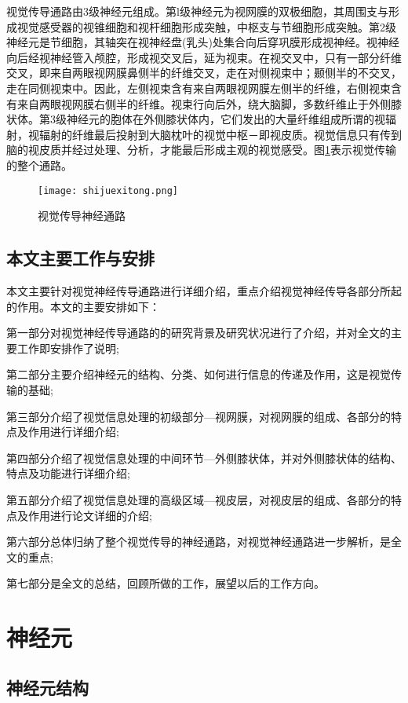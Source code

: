 \documentclass[a4paper,10pt]{article}\large
\begin{document}
视觉传导通路由3级神经元组成\cite{4:misc}。第l级神经元为视网膜的双极细胞，其周围支与形成视觉感受器的视锥细胞和视杆细胞形成突触，中枢支与节细胞形成突触。第2级神经元是节细胞，其轴突在视神经盘(乳头)处集合向后穿巩膜形成视神经。视神经向后经视神经管入颅腔，形成视交叉后，延为视束。在视交叉中，只有一部分纤维交叉，即来自两眼视网膜鼻侧半的纤维交叉，走在对侧视束中；颞侧半的不交叉，走在同侧视束中。因此，左侧视束含有来自两眼视网膜左侧半的纤维，右侧视束含有来自两眼视网膜右侧半的纤维。视束行向后外，绕大脑脚，多数纤维止于外侧膝状体。第3级神经元的胞体在外侧膝状体内，它们发出的大量纤维组成所谓的视辐射，视辐射的纤维最后投射到大脑枕叶的视觉中枢－即视皮质。视觉信息只有传到脑的视皮质并经过处理、分析，才能最后形成主观的视觉感受。图\ref{fig 1}表示视觉传输的整个通路。


\begin{figure}[!htb]
\centering
\texttt{[image: shijuexitong.png]}
\caption{视觉传导神经通路}\label{fig 1} 
\end{figure}


\subsection{本文主要工作与安排}

本文主要针对视觉神经传导通路进行详细介绍，重点介绍视觉神经传导各部分所起的作用。本文的主要安排如下：


第一部分对视觉神经传导通路的的研究背景及研究状况进行了介绍，并对全文的主要工作即安排作了说明;


第二部分主要介绍神经元的结构、分类、如何进行信息的传递及作用，这是视觉传输的基础;


第三部分介绍了视觉信息处理的初级部分---视网膜，对视网膜的组成、各部分的特点及作用进行详细介绍;


第四部分介绍了视觉信息处理的中间环节---外侧膝状体，并对外侧膝状体的结构、特点及功能进行详细介绍;


第五部分介绍了视觉信息处理的高级区域---视皮层，对视皮层的组成、各部分的特点及作用进行论文详细的介绍;


第六部分总体归纳了整个视觉传导的神经通路，对视觉神经通路进一步解析，是全文的重点;


第七部分是全文的总结，回顾所做的工作，展望以后的工作方向。

\section{神经元} 

\subsection{神经元结构}
\end{document}
